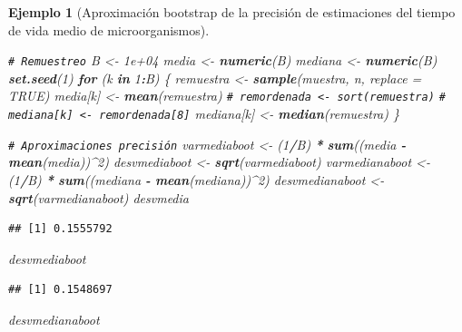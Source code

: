 \documentclass[
]{book}
\newenvironment{Shaded}{\begin{snugshade}}{\end{snugshade}}
\newcommand{\AttributeTok}[1]{\textcolor[rgb]{0.13,0.29,0.53}{#1}}
\newcommand{\CommentTok}[1]{\textcolor[rgb]{0.56,0.35,0.01}{\textit{#1}}}
\newcommand{\ConstantTok}[1]{\textcolor[rgb]{0.56,0.35,0.01}{#1}}
\newcommand{\ControlFlowTok}[1]{\textcolor[rgb]{0.13,0.29,0.53}{\textbf{#1}}}
\newcommand{\DecValTok}[1]{\textcolor[rgb]{0.00,0.00,0.81}{#1}}
\newcommand{\FloatTok}[1]{\textcolor[rgb]{0.00,0.00,0.81}{#1}}
\newcommand{\FunctionTok}[1]{\textcolor[rgb]{0.13,0.29,0.53}{\textbf{#1}}}
\newcommand{\NormalTok}[1]{#1}
\newcommand{\OtherTok}[1]{\textcolor[rgb]{0.56,0.35,0.01}{#1}}
\newcommand{\SpecialCharTok}[1]{\textcolor[rgb]{0.81,0.36,0.00}{\textbf{#1}}}
\theoremstyle{break}
\newtheorem{example}{Ejemplo}[chapter]
\theoremstyle{nonumberplain}
\renewcommand{\CommentTok}[1]{\textcolor[rgb]{0.41,0.41,0.41}{\texttt{#1}}}
\begin{document}
\begin{example}[Aproximación bootstrap de la precisión de estimaciones del tiempo de vida medio de microorganismos]
\begin{Shaded}
\begin{Highlighting}[]
\CommentTok{\# Remuestreo}
\NormalTok{B }\OtherTok{\textless{}{-}} \FloatTok{1e+04}
\NormalTok{media }\OtherTok{\textless{}{-}} \FunctionTok{numeric}\NormalTok{(B)}
\NormalTok{mediana }\OtherTok{\textless{}{-}} \FunctionTok{numeric}\NormalTok{(B)}
\FunctionTok{set.seed}\NormalTok{(}\DecValTok{1}\NormalTok{)}
\ControlFlowTok{for}\NormalTok{ (k }\ControlFlowTok{in} \DecValTok{1}\SpecialCharTok{:}\NormalTok{B) \{}
\NormalTok{    remuestra }\OtherTok{\textless{}{-}} \FunctionTok{sample}\NormalTok{(muestra, n, }\AttributeTok{replace =} \ConstantTok{TRUE}\NormalTok{)}
\NormalTok{    media[k] }\OtherTok{\textless{}{-}} \FunctionTok{mean}\NormalTok{(remuestra)}
    \CommentTok{\# remordenada \textless{}{-} sort(remuestra)}
    \CommentTok{\# mediana[k] \textless{}{-} remordenada[8]}
\NormalTok{    mediana[k] }\OtherTok{\textless{}{-}} \FunctionTok{median}\NormalTok{(remuestra)}
\NormalTok{\}}

\CommentTok{\# Aproximaciones precisión}
\NormalTok{varmediaboot }\OtherTok{\textless{}{-}}\NormalTok{ (}\DecValTok{1}\SpecialCharTok{/}\NormalTok{B) }\SpecialCharTok{*} \FunctionTok{sum}\NormalTok{((media }\SpecialCharTok{{-}} \FunctionTok{mean}\NormalTok{(media))}\SpecialCharTok{\^{}}\DecValTok{2}\NormalTok{)}
\NormalTok{desvmediaboot }\OtherTok{\textless{}{-}} \FunctionTok{sqrt}\NormalTok{(varmediaboot)}
\NormalTok{varmedianaboot }\OtherTok{\textless{}{-}}\NormalTok{ (}\DecValTok{1}\SpecialCharTok{/}\NormalTok{B) }\SpecialCharTok{*} \FunctionTok{sum}\NormalTok{((mediana }\SpecialCharTok{{-}} \FunctionTok{mean}\NormalTok{(mediana))}\SpecialCharTok{\^{}}\DecValTok{2}\NormalTok{)}
\NormalTok{desvmedianaboot }\OtherTok{\textless{}{-}} \FunctionTok{sqrt}\NormalTok{(varmedianaboot)}
\NormalTok{desvmedia}
\end{Highlighting}
\end{Shaded}

\begin{verbatim}
## [1] 0.1555792
\end{verbatim}

\begin{Shaded}
\begin{Highlighting}[]
\NormalTok{desvmediaboot}
\end{Highlighting}
\end{Shaded}

\begin{verbatim}
## [1] 0.1548697
\end{verbatim}

\begin{Shaded}
\begin{Highlighting}[]
\NormalTok{desvmedianaboot}
\end{Highlighting}
\end{Shaded}


\end{example}
\end{document}
